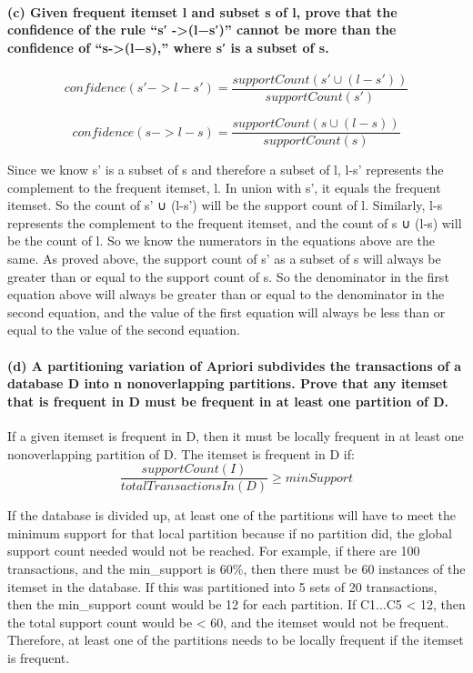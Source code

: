 \documentclass[11pt]{article}
\begin{document}
    \paragraph{(c) Given frequent itemset l and subset s of l, prove that
the confidence of the rule ``s′ -\textgreater{}(l−s′)'' cannot be more
than the confidence of ``s-\textgreater{}(l−s),'' where s′ is a subset
of
s.}\label{c-given-frequent-itemset-l-and-subset-s-of-l-prove-that-the-confidence-of-the-rule-s--ls-cannot-be-more-than-the-confidence-of-s-ls-where-s-is-a-subset-of-s.}

    \[ confidence(s'->l-s')= \frac{supportCount(s' ∪ (l-s'))}{supportCount(s')}\]

\[confidence(s->l-s)= \frac{supportCount(s ∪ (l-s))}{supportCount(s)}\]

    Since we know s' is a subset of s and therefore a subset of l, l-s'
represents the complement to the frequent itemset, l. In union with s',
it equals the frequent itemset. So the count of s' ∪ (l-s') will be the
support count of l. Similarly, l-s represents the complement to the
frequent itemset, and the count of s ∪ (l-s) will be the count of l. So
we know the numerators in the equations above are the same. As proved
above, the support count of s' as a subset of s will always be greater
than or equal to the support count of s. So the denominator in the first
equation above will always be greater than or equal to the denominator
in the second equation, and the value of the first equation will always
be less than or equal to the value of the second equation.

    \paragraph{(d) A partitioning variation of Apriori subdivides the
transactions of a database D into n nonoverlapping partitions. Prove
that any itemset that is frequent in D must be frequent in at least one
partition of
D.}\label{d-a-partitioning-variation-of-apriori-subdivides-the-transactions-of-a-database-d-into-n-nonoverlapping-partitions.-prove-that-any-itemset-that-is-frequent-in-d-must-be-frequent-in-at-least-one-partition-of-d.}

    If a given itemset is frequent in D, then it must be locally frequent in
at least one nonoverlapping partition of D. The itemset is frequent in D
if: \[ \frac{supportCount(I)}{totalTransactionsIn(D)} \geq minSupport \]

If the database is divided up, at least one of the partitions will have
to meet the minimum support for that local partition because if no
partition did, the global support count needed would not be reached. For
example, if there are 100 transactions, and the min\_support is 60\%,
then there must be 60 instances of the itemset in the database. If this
was partitioned into 5 sets of 20 transactions, then the min\_support
count would be 12 for each partition. If C1...C5 \textless{} 12, then
the total support count would be \textless{} 60, and the itemset would
not be frequent. Therefore, at least one of the partitions needs to be
locally frequent if the itemset is frequent.
\end{document}
